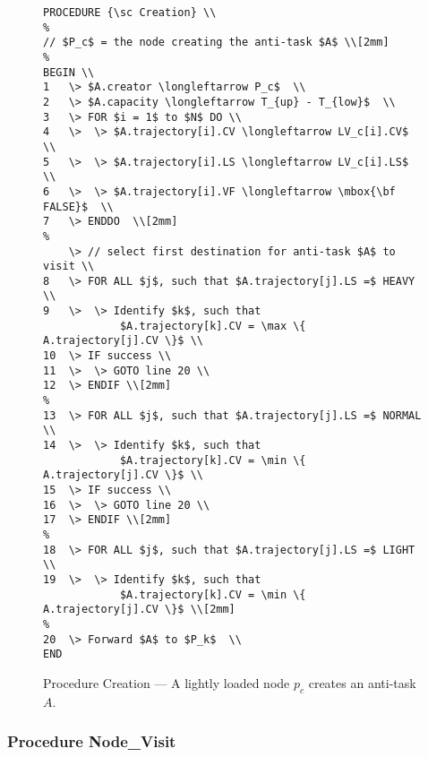 \begin{figure}[p]
\begin{verbatim}
PROCEDURE {\sc Creation} \\
%
// $P_c$ = the node creating the anti-task $A$ \\[2mm]
%
BEGIN \\
1	\> $A.creator \longleftarrow P_c$  \\
2	\> $A.capacity \longleftarrow T_{up} - T_{low}$  \\
3	\> FOR $i = 1$ to $N$ DO \\
4	\>	\> $A.trajectory[i].CV \longleftarrow LV_c[i].CV$  \\
5	\>	\> $A.trajectory[i].LS \longleftarrow LV_c[i].LS$  \\
6	\>	\> $A.trajectory[i].VF \longleftarrow \mbox{\bf FALSE}$  \\
7	\> ENDDO  \\[2mm]
%
 	\> // select first destination for anti-task $A$ to visit \\
8	\> FOR ALL $j$, such that $A.trajectory[j].LS =$ HEAVY \\
9	\>	\> Identify $k$, such that 
			$A.trajectory[k].CV = \max \{ A.trajectory[j].CV \}$ \\ 
10	\> IF success \\
11	\>	\> GOTO line 20 \\
12	\> ENDIF \\[2mm]
%
13	\> FOR ALL $j$, such that $A.trajectory[j].LS =$ NORMAL \\
14	\>	\> Identify $k$, such that 
			$A.trajectory[k].CV = \min \{ A.trajectory[j].CV \}$ \\ 
15	\> IF success \\
16	\>	\> GOTO line 20 \\
17	\> ENDIF \\[2mm]
%
18	\> FOR ALL $j$, such that $A.trajectory[j].LS =$ LIGHT \\
19	\>	\> Identify $k$, such that 
			$A.trajectory[k].CV = \min \{ A.trajectory[j].CV \}$ \\[2mm]
%
20	\> Forward $A$ to $P_k$  \\
END
\end{verbatim}
\caption {Procedure {\sc Creation} --- A lightly loaded node $p_c$ creates an anti-task $A$.}
\label{fig:anti.basic.procedure_creation}
\end{figure}


\subsubsection {Procedure \sc Node\_Visit}

